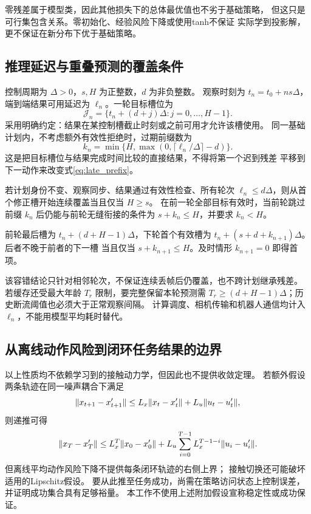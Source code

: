 零残差属于模型类，因此其他损失下的总体最优值也不劣于基础策略，
但这只是可行集包含关系。零初始化、经验风险下降或使用tanh不保证
实际学到投影解，更不保证在新分布下优于基础策略。

\subsection{推理延迟与重叠预测的覆盖条件}

控制周期为 $\Delta>0$，$s,H$ 为正整数，$d$ 为非负整数。
观察时刻为 $t_n=t_0+ns\Delta$，
端到端结果可用延迟为 $\ell_n$。一轮目标槽位为
\begin{equation}
 \mathcal J_n=\{t_n+(d+j)\Delta:j=0,\ldots,H-1\}.
\end{equation}
采用明确约定：结果在某控制槽截止时刻或之前可用才允许该槽使用。
同一基础计划内，不考虑额外有效性拒绝时，过期前缀数为
\begin{equation}
 k_n=\min\{H,\max(0,\lceil\ell_n/\Delta\rceil-d)\}.
 \label{eq:late_prefix}
\end{equation}
这是把目标槽位与结果完成时间比较的直接结果，不得将第一个迟到残差
平移到下一动作来改变式\eqref{eq:late_prefix}。

\begin{proposition}[及时覆盖与重叠容错]
\label{prop:coverage}
若计划身份不变、观察同步、结果通过有效性检查、所有轮次
$\ell_n\leq d\Delta$，则从首个修正槽开始连续覆盖当且仅当 $H\geq s$。
在前一轮全部目标有效时，当前轮跳过前缀 $k_n$ 后仍能与前轮无缝衔接的条件为
$s+k_n\leq H$，并要求 $k_n<H$。
\end{proposition}
\begin{IEEEproof}
前轮最后槽为 $t_n+(d+H-1)\Delta$，下轮首个有效槽为
$t_n+(s+d+k_{n+1})\Delta$。后者不晚于前者的下一槽
当且仅当 $s+k_{n+1}\leq H$。及时情形 $k_{n+1}=0$ 即得首项。
\end{IEEEproof}

该容错结论只针对相邻轮次，不保证连续丢帧后仍覆盖，也不跨计划继承残差。
若缓存还受最大年龄 $T_r$ 限制，要完整保留本轮预测需
$T_r\geq(d+H-1)\Delta$；历史断流阈值也必须大于正常观察间隔。
计算调度、相机传输和机器人通信均计入 $\ell_n$，不能用模型平均耗时替代。

\subsection{从离线动作风险到闭环任务结果的边界}

以上性质均不依赖学习到的接触动力学，但因此也不提供收敛定理。
若额外假设两条轨迹在同一噪声耦合下满足
\begin{equation}
 \lVert x_{t+1}-x'_{t+1}\rVert
 \leq L_x\lVert x_t-x'_t\rVert+L_u\lVert u_t-u'_t\rVert,
\end{equation}
则递推可得
\begin{equation}
 \lVert x_T-x'_T\rVert\leq L_x^T\lVert x_0-x'_0\rVert
 +L_u\sum_{i=0}^{T-1}L_x^{T-1-i}\lVert u_i-u'_i\rVert.
\end{equation}
但离线平均动作风险下降不提供每条闭环轨迹的右侧上界；
接触切换还可能破坏适用的Lipschitz假设。
要从此推至任务成功，尚需在策略访问状态上控制误差，并证明成功集合具有足够裕量。
本工作不使用上述附加假设宣称稳定性或成功保证。

